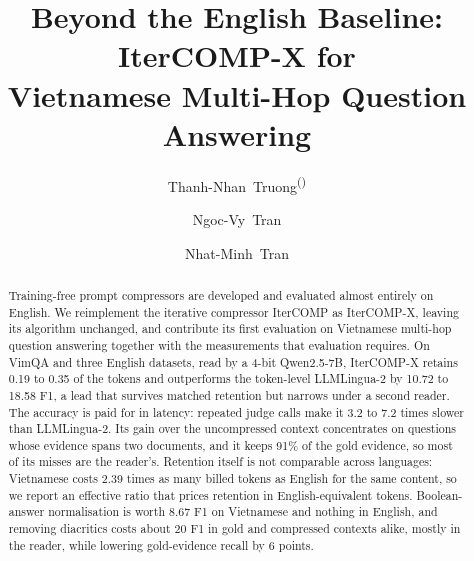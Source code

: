 \documentclass[runningheads]{llncs}
\newcommand{\envelopeicon}{\ding{41}}
\begin{document}
\title{Beyond the English Baseline: {IterCOMP-X} for\\Vietnamese Multi-Hop Question Answering}


\author{Thanh-Nhan~Truong\textsuperscript{(\envelopeicon)} \and
Ngoc-Vy~Tran \and
Nhat-Minh~Tran}



\maketitle
\begin{abstract}
Training-free prompt compressors are developed and evaluated almost entirely on
English. We reimplement the iterative compressor IterCOMP as IterCOMP-X, leaving
its algorithm unchanged, and contribute its first evaluation on Vietnamese
multi-hop question answering together with the measurements that evaluation
requires. On VimQA and three English datasets, read by a 4-bit Qwen2.5-7B,
IterCOMP-X retains 0.19 to 0.35 of the tokens and outperforms the token-level
LLMLingua-2 by 10.72 to 18.58 F1, a lead that survives matched retention but
narrows under a second reader. The accuracy is paid for in latency: repeated
judge calls make it 3.2 to 7.2 times slower than LLMLingua-2. Its gain over the
uncompressed context concentrates on questions whose evidence spans two
documents, and it keeps 91\% of the gold evidence, so most of its misses are
the reader's. Retention itself is not
comparable across languages: Vietnamese costs 2.39 times as many billed tokens as
English for the same content, so we report an effective ratio that prices
retention in English-equivalent tokens. Boolean-answer normalisation is worth
8.67 F1 on Vietnamese and nothing in English, and removing diacritics costs about 20 F1 in gold and compressed contexts alike, mostly in the reader, while lowering gold-evidence recall by 6 points.

\end{abstract}
\end{document}
